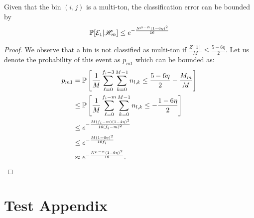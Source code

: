 \begin{lemma}
\label{Lem:MultitonClassif}
Given that the bin $(i,j)$ is a multi-ton, the classification error can be bounded by
\begin{align*}
\mathbb{P}[\mathcal{E}_1|\mathscr{H}_m]\leq e^{-\frac{N^{\mu-\alpha}(1-6\eta)^2}{16}}
\end{align*}
\end{lemma}
\begin{proof}
We observe that a bin is not classified as multi-ton if $\frac{Z[1]}{M}\leq\frac{5-6\eta}{2}$. Let us denote the probability of this event as $p_{m1}$ which can be bounded as:
\begin{align*}
p_{m1}&=\mathbb{P}\left[\frac{1}{M}\sum\limits_{\ell=0}^{f_{i}-3}\sum\limits_{k=0}^{M-1} n_{l,k}\leq\frac{5-6\eta}{2}-\frac{M_m}{M}\right]\\
&\leq \mathbb{P}\left[\frac{1}{M}\sum\limits_{\ell=0}^{f_{i}-m}\sum\limits_{k=0}^{M-1} n_{l,k}\leq-\frac{1-6\eta}{2}\right]\\
&\leq e^{-\frac{M(f_i-m)(1-4\eta)^2}{16(f_i-m)^{2}}}\\
&\leq e^{-\frac{M(1-6\eta)^2}{16 f_i}}\\
 &\approx e^{-\frac{N^{\mu-\alpha}(1-6\eta)^2}{16}}.
\end{align*} 
\end{proof}

\section{Test Appendix}

\begin{lemma}
\end{lemma}

\begin{lemma}
\end{lemma}
